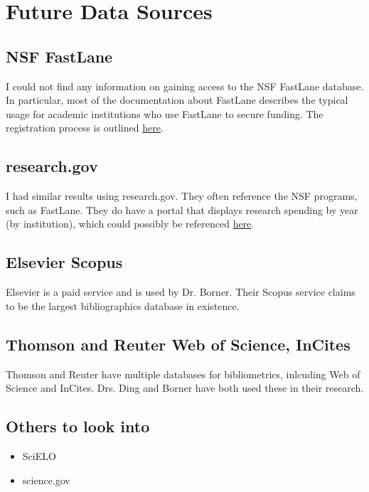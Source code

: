 \documentclass[]{article}
\begin{document}
\section{Future Data Sources}

\subsection{NSF FastLane}
I could not find any information on gaining access to the NSF FastLane database. In particular, most of the documentation about FastLane describes the typical usage for academic institutions who use FastLane to secure funding. The registration process is outlined \href{https://www.fastlane.nsf.gov/a0/about/registration.htm}{here}.

\subsection{research.gov}
I had similar results using research.gov. They often reference the NSF programs, such as FastLane. They do have a portal that displays research spending by year (by institution), which could possibly be referenced \href{https://www.research.gov/research-portal/appmanager/base/desktop?_nfpb=true&_eventName=viewQuickSearchFormEvent_so_rsr}{here}.

\subsection{Elsevier Scopus}
Elsevier is a paid service and is used by Dr. Borner. Their Scopus service claims to be the largest bibliographics database in existence.\cite{borner}

\subsection{Thomson and Reuter Web of Science, InCites}
Thomson and Reuter have multiple databases for bibliometrics, inlcuding Web of Science and InCites. Drs. Ding and Borner have both used these in their research.\cite{borner}\cite{ding}

\subsection{Others to look into}
\begin{itemize}
\item SciELO
\item science.gov
\end{itemize}



\end{document}
